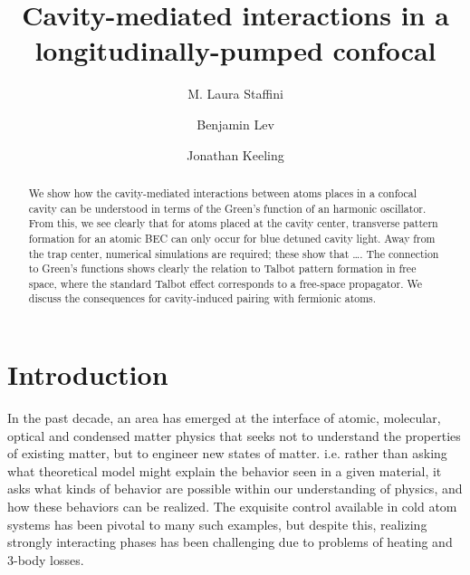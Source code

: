 \documentclass[pra,twocolumn,superscriptaddress]{revtex4-1}
\begin{document}
\title{Cavity-mediated interactions in a longitudinally-pumped
confocal }

\author{M. Laura Staffini}
\author{Benjamin Lev}
\author{Jonathan Keeling}

\begin{abstract}
  We show how the cavity-mediated interactions between atoms places in
  a confocal cavity can be understood in terms of the Green's function
  of an harmonic oscillator.  From this, we see clearly that for atoms
  placed at the cavity center, transverse pattern formation for an
  atomic BEC can only occur for blue detuned cavity light.  Away from
  the trap center, numerical simulations are required; these show that
  \ldots.  The connection to Green's functions shows clearly the
  relation to Talbot pattern formation in free space, where the
  standard Talbot effect corresponds to a free-space propagator. We
  discuss the consequences for cavity-induced pairing with fermionic
  atoms.
\end{abstract}

\maketitle

\section{Introduction}
\label{sec:introduction}


In the past decade, an area has emerged at the interface of atomic,
molecular, optical and condensed matter physics that seeks not to
understand the properties of existing matter, but to engineer new
states of matter.  i.e. rather than asking what theoretical model
might explain the behavior seen in a given material, it asks what
kinds of behavior are possible within our understanding of physics,
and how these behaviors can be realized.  The exquisite control
available in cold atom systems has been pivotal to many such examples,
but despite this, realizing strongly interacting phases has been
challenging due to problems of heating and 3-body losses. 
\end{document}
